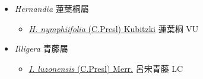 
  \begin{itemize}
 \item[] \textit{Hernandia} 蓮葉桐屬
                    
  \begin{itemize}
        \item[] \href{http://www.theplantlist.org/tpl1.1/search?q=Hernandia+nymphiifolia}{\textit{H. nymphiifolia} (C.Presl) Kubitzki}   蓮葉桐 VU
  \end{itemize}
 \item[] \textit{Illigera} 青藤屬
                    
  \begin{itemize}
        \item[] \href{http://www.theplantlist.org/tpl1.1/search?q=Illigera+luzonensis}{\textit{I. luzonensis} (C.Presl) Merr.}   呂宋青藤 LC
  \end{itemize}
  \end{itemize}
